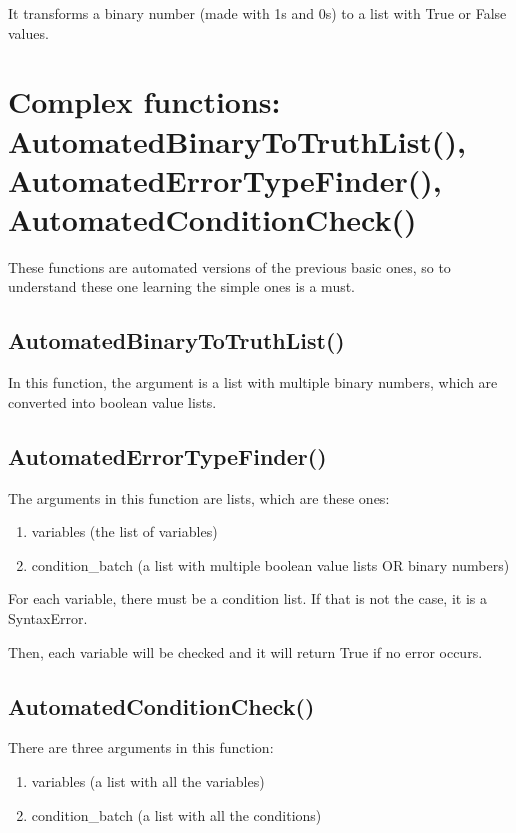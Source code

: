 \documentclass{article}
\begin{document}
	It transforms a binary number (made with 1s and 0s) to a list with True or False values.
	\label{binary}
	
	\newpage
	\section{Complex functions: AutomatedBinaryToTruthList(), AutomatedErrorTypeFinder(), AutomatedConditionCheck()}
	\label{complex}
	
	These functions are automated versions of the previous basic ones, so to understand these one learning the simple ones is a must.
	
	\subsection{AutomatedBinaryToTruthList()}
	
	
	
	In this function, the argument is a list with multiple binary numbers, which are converted into boolean value lists.
	
	\newpage
	\subsection{AutomatedErrorTypeFinder()}
	
 	
 	The arguments in this function are lists, which are these ones:
 	\begin{enumerate}
 		\item variables (the list of variables)
 		\item condition\_batch (a list with multiple boolean value lists OR binary numbers)
 	\end{enumerate}
 	
 	For each variable, there must be a condition list. If that is not the case, it is a SyntaxError.
 	
 	Then, each variable will be checked and it will return True if no error occurs.
 	
 	\newpage
 	\subsection{AutomatedConditionCheck()}
 	
 	
 	There are three arguments in this function:
 	\begin{enumerate}
 		\item variables (a list with all the variables)
 		\item condition\_batch (a list with all the conditions)
 	\end{enumerate}
 	
\end{document}
